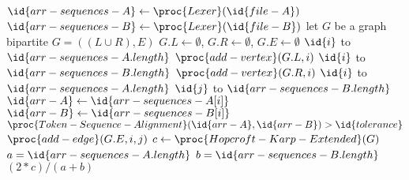 \begin{codebox}
\li $\id{arr-sequences-A} \gets \proc{Lexer}(\id{file-A})$
\li $\id{arr-sequences-B} \gets \proc{Lexer}(\id{file-B})$
\li let $G$ be a graph bipartite $G=((L \cup R), E)$
\li $G.L \gets \emptyset$, $G.R \gets \emptyset$, $G.E \gets \emptyset$
\li \For $\id{i}$ to $\id{arr-sequences-A.length}$ \Do
\li $\proc{add-vertex}(G.L, i)$ \End
\li \For $\id{i}$ to $\id{arr-sequences-B.length}$ \Do
\li $\proc{add-vertex}(G.R, i)$ \End
\li \For $\id{i}$ to $\id{arr-sequences-A.length}$ \Do
\li \For $\id{j}$ to $\id{arr-sequences-B.length}$ \Do
\li $\id{arr-A} \gets \id{arr-sequences-A[i]}$
\li $\id{arr-B} \gets \id{arr-sequences-B[i]}$
\li \If $\proc{Token-Sequence-Alignment}(\id{arr-A}, \id{arr-B}) > \id{tolerance}$ \Then
\li $\proc{add-edge}(G.E, i, j)$ \End \End \End
\li $c \gets \proc{Hopcroft-Karp-Extended}(G)$
\li $a = \id{arr-sequences-A.length}$
\li $b = \id{arr-sequences-B.length}$
\li \Return $(2 * c) / (a + b)$
\end{codebox}
